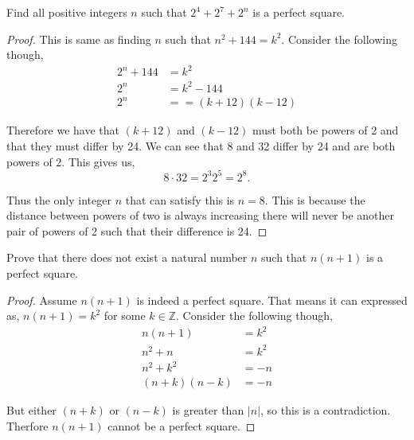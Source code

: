 \documentclass[11pt]{article}
\newenvironment{problem}[2][Problem\!]{\begin{trivlist}
\item[\hskip \labelsep {\bfseries #1}\hskip \labelsep {\bfseries #2}]}{\end{trivlist}}
\newcommand{\zz}{\mathbb Z}   %
\newcommand{\abs}[1]{\left\lvert#1\right\rvert} %
\begin{document}
\begin{tcolorbox}
    \begin{problem} {IC | 11/12 | 143.}
        Find all positive integers $n$ such that $2^{4} + 2^{7} + 2^{n}$ is a perfect square. 
    \end{problem}
\end{tcolorbox}
\begin{proof}
    This is same as finding $n$ such that $n^{2} + 144 = k^{2}$. Consider the following though,
    \begin{align*}
        2^{n} + 144 &= k^{2} \\
        2^{n} &= k^{2} - 144 \\
        2^{n} &= = (k + 12)(k-12)
    \end{align*}

    Therefore we have that $(k+12)$ and $(k-12)$ must both be powers of 2 and that they must differ by 24. We can see that 8 and 32 differ by 24 and are both powers of 2. This gives us,
    \[8 \cdot 32 = 2^{3}2^{5} = 2^{8}.\]

    Thus the only integer $n$ that can satisfy this is $n = 8$. This is because the distance between powers of two is always increasing there will never be another pair of powers of 2 such that their difference is 24. 
\end{proof}
\newpage

\begin{tcolorbox}
    \begin{problem} {OC | 11/10 | 88.}
        Prove that there does not exist a natural number $n$ such that $n(n+1)$ is a perfect square.
    \end{problem}
\end{tcolorbox}
\begin{proof}
    Assume $n(n+1)$ is indeed a perfect square. That means it can expressed as, $n(n+1)= k^{2}$ for some $k \in \zz$. Consider the following though,
    \begin{align*}
        n(n+1) &= k^{2} \\
        n^{2} + n &= k^{2} \\
        n^{2} + k^{2} &= -n \\
        (n+k)(n-k) &= -n
    \end{align*}

    But either $(n+k)$ or $(n-k)$ is greater than $\abs{n}$, so this is a contradiction. Therfore $n(n+1)$ cannot be a perfect square. 
\end{proof}
\end{document}
